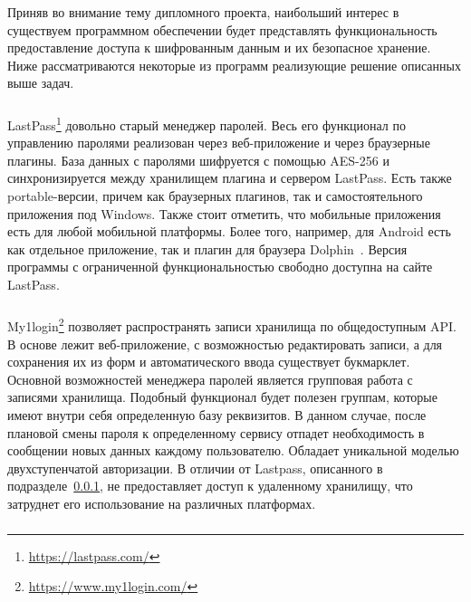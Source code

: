 Приняв во внимание тему дипломного проекта, наибольший интерес в существуем программном обеспечении будет представлять функциональность предоставление доступа к шифрованным данным и их безопасное хранение.
Ниже рассматриваются некоторые из программ реализующие решение описанных выше задач.

\subsubsection{}
\label{sub:descript:existing_programs:lastpass}

LastPass\footnote{\url{https://lastpass.com/}} довольно старый менеджер паролей. Весь его функционал по управлению паролями реализован через веб-приложение и через браузерные плагины.
База данных с паролями шифруется с помощью AES-256 и синхронизируется между хранилищем плагина и сервером LastPass. Есть также portable-версии, причем как браузерных плагинов, так и самостоятельного приложения под Windows.
Также стоит отметить, что мобильные приложения есть для любой мобильной платформы. Более того, например, для Android есть как отдельное приложение, так и плагин для браузера Dolphin~\cite{dolphin}.
Версия программы с ограниченной функциональностью свободно доступна на сайте LastPass.

\subsubsection{}
\label{sub:descript:existing_programs:myonelogin}

My1login\footnote{\url{https://www.my1login.com/}} позволяет распространять записи хранилища по общедоступным API. В основе лежит веб-приложение, с возможностью редактировать записи, а для сохранения их из форм и автоматического ввода существует \javascr{} букмарклет. Основной возможностей менеджера паролей является групповая работа с записями хранилища.
Подобный функционал будет полезен группам, которые имеют внутри себя определенную базу реквизитов. В данном случае, после плановой смены пароля к определенному сервису отпадет необходимость в сообщении новых данных каждому пользователю.
Обладает уникальной моделью двухступенчатой авторизации.
В отличии от Lastpass, описанного в подразделе~\ref{sub:descript:existing_programs:lastpass}, не предоставляет доступ к удаленному хранилищу, что затруднет его использование на различных платформах.

\subsubsection{}
\label{sub:descript:existing_programs:myonelogin}

